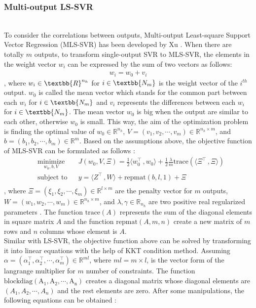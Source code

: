 \subsubsection{Multi-output LS-SVR}
\\To consider the correlations between outputs, Multi-output Least-square Support Vector Regression (MLS-SVR) has been developed by Xu \cite{xu2013multi}. When there are totally $m$ outputs,
to transform single-output SVR to MLS-SVR, the elements in the weight vector $w_i$ can be expressed by the sum of two vectors as follows:
\begin{align}
    w_i=w_0+v_i
\end{align}
, where $w_i \in \textbb{R}^{n_h}$ for $i \in \textbb{N_m}$ is the weight vector of the $i^{th}$ output. $w_0$ is called the mean vector which stands for the common part between each $w_i$ for $i \in \textbb{N_m}$ and $v_i$ represents the differences between each $w_i$ for $i \in \textbb{N_m}$. The mean vector $w_0$ is big when the output are similar to each other, otherwise $w_0$ is small. This way, the aim of the optimization problem is finding the optimal value of $w_0 \in \mathbb{R}^{n_h}$, $V = ( v_1, v_2, \cdots, v_m ) \in \mathbb{R}^{n_h \times m} $, and $b = (b_1, b_2, \cdots, b_m) \in \mathbb{R}^{m}$. Based on the assumptions above, the objective function of MLS-SVR can be formulated as follows \cite{xu2013multi}:
\begin{equation}
    \begin{aligned}
    & \underset{ w_0, b, V}{\text{minimize}}
    & & J( w_0, V, \Xi)= \frac{1}{2} \langle w_0^{\intercal} \,, w_0 \rangle +\frac{1}{2} \frac{\lambda}{m} \mathrm{trace} (\langle \Xi^{\intercal} \,, \Xi \rangle) \\ 
    & \text{subject to}
    & & y = \langle  Z^{\intercal} \,, W \rangle + \mathrm{repmat}(b, l, 1 )+\Xi\\
    \label{eq:obj_fun_MLS_SVM}
    \end{aligned}
\end{equation}
, where $ \Xi = ( \xi_1, \xi_2, \cdots, \xi_m ) \in \mathbb{R}^{l \times m}$ are the penalty vector for $m$ outputs, $ W = ( w_1, w_2, \cdots, w_m ) \in \mathbb{R}^{n_h \times m}$, and $\lambda, \gamma \in \mathbb{R}_{n_h}$ are two positive real regularized parameters \cite{xu2013multi}. The function $\mathrm{trace}(A)$ represents the sum of the diagonal elements in square matrix $A$ and the function $\mathrm{repmat}(A, m, n)$ create a new matrix of $m$ rows and $n$ columns whose element is $A$.
\bigskip
\\Similar with LS-SVR, the objective function above can be solved by transforming it into linear equations with the help of KKT condition method. Assuming $\alpha = ( \alpha_{1}^{\intercal}, \alpha_{2}^{\intercal},\cdots,\alpha_{m}^{\intercal} ) \in \mathbb{R}^{ml}$, where $ml = m \times l$, is the vector form of the langrange multiplier for $m$ number of constraints. The function $\mathrm{blockdiag(A_1, A_2,\cdots, A_n)}$ creates a diagonal matrix whose diagonal elements are $(A_1, A_2,\cdots, A_n)$ and the rest elements are zero. After some manipulations, the following equations can be obtained \cite{xu2013multi}:
